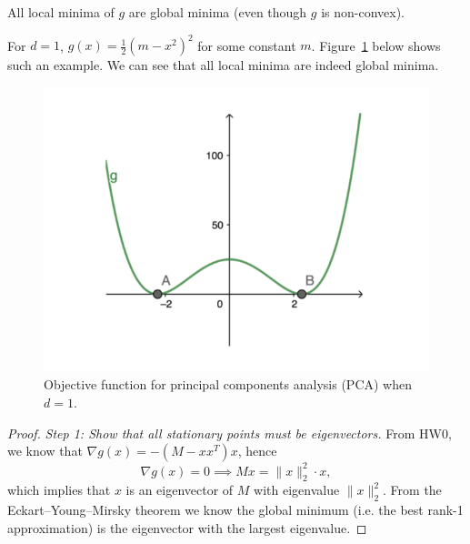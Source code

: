 \begin{definition} 
\begin{theorem}
All local minima of $g$ are global minima (even though $g$ is non-convex).
\end{theorem}

\begin{remark}
For $d = 1$, $g(x) = \frac{1}{2}(m - x^2)^2$ for some constant $m$. Figure~\ref{lec10:fig:pca_objective} below shows such an example. We can see that all local minima are indeed global minima.
\end{remark}

\begin{figure}[H]
    \centering
    \includegraphics[scale = 0.4]{figures/pca.png}
    \caption{Objective function for principal components analysis (PCA) when $d = 1$.}
    \label{lec10:fig:pca_objective}
\end{figure}

\begin{proof}

\textit{Step 1: Show that all stationary points must be eigenvectors.} From HW0, we know that $\nabla g(x) = -(M - xx^T)x$, hence
\begin{equation}\label{lec10:eqn:pca-firstorder}
\nabla g(x) = 0 \implies Mx = \|x\|_2^2\cdot x,
\end{equation}
which implies that $x$ is an eigenvector of $M$ with eigenvalue $\|x\|_2^2$. From the Eckart–Young–Mirsky theorem we know the global minimum (i.e. the best rank-1 approximation) is the eigenvector with the largest eigenvalue.


\end{proof}
\end{definition}
